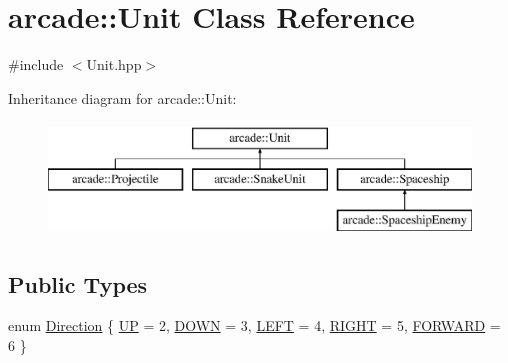 \hypertarget{classarcade_1_1_unit}{}\section{arcade\+:\+:Unit Class Reference}
\label{classarcade_1_1_unit}


{\ttfamily \#include $<$Unit.\+hpp$>$}

Inheritance diagram for arcade\+:\+:Unit\+:\begin{figure}[H]
\begin{center}
\leavevmode
\includegraphics[height=3.000000cm]{classarcade_1_1_unit}
\end{center}
\end{figure}
\subsection*{Public Types}
\begin{DoxyCompactItemize}
\item 
enum \hyperlink{classarcade_1_1_unit_af418afeaba1f7fd5934b6ae1343215dd}{Direction} \{ \newline
\hyperlink{classarcade_1_1_unit_af418afeaba1f7fd5934b6ae1343215dda01d1f45d2a1f46111e0a7a4bb9bd5555}{UP} = 2, 
\hyperlink{classarcade_1_1_unit_af418afeaba1f7fd5934b6ae1343215dda5f32d341b3496680d6f76b2e27a5038b}{D\+O\+WN} = 3, 
\hyperlink{classarcade_1_1_unit_af418afeaba1f7fd5934b6ae1343215ddafb9de8c64a904e3e78e9a62907de7f6f}{L\+E\+FT} = 4, 
\hyperlink{classarcade_1_1_unit_af418afeaba1f7fd5934b6ae1343215ddab94e0ec58f3e9b07b9f65e3001e64171}{R\+I\+G\+HT} = 5, 
\newline
\hyperlink{classarcade_1_1_unit_af418afeaba1f7fd5934b6ae1343215dda5a33eaa50fc5e4fda0befda90cf68c60}{F\+O\+R\+W\+A\+RD} = 6
 \}
\end{DoxyCompactItemize}
